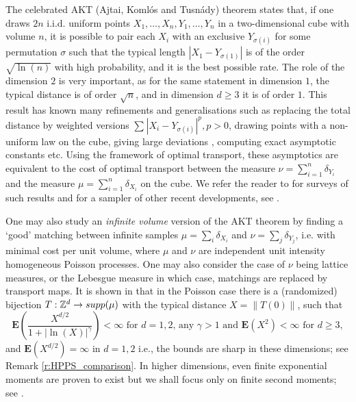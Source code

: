 \documentclass[12pt]{article}
\newcommand{\1}{\mathbf{1}}
\renewcommand{\footnote}[1]{}
\begin{document}
The celebrated AKT (Ajtai, Koml\'os and Tusn\'ady) theorem \cite{ajtai1984optimal} states that, if one draws $2n$ i.i.d.   uniform points $ X_{1},\dots ,X_{n},Y_{1},\dots ,Y_{n}$ in a two-dimensional cube with volume $n$, it is possible to pair each $ X_{i}$ with an exclusive $ Y_{\sigma (i)}$ for some permutation $ \sigma $  such that the typical length $|X_{1}-Y_{\sigma (1)}|$ is of the order $ \sqrt{\ln(n)}$ with high probability, and it is the best possible rate. The role of the dimension $ 2$ is very important, as for the same statement in dimension $ 1$, the typical distance is of order $ \sqrt{n}$, and in dimension $ d \geqslant 3$ it is of order $ 1.$ This result has known many refinements and generalisations such as replacing the total distance by weighted versions $ \sum_{} | X_{i}-Y_{\sigma (i)} | ^{p},p>0$,  drawing points with a non-uniform law on the cube, giving large deviations  \cite{fournier2015rate}, computing exact {asymptotic constants  \cite{ambrosio2019pde,huesmann2024asymptotics} etc}. Using the framework of optimal transport, these asymptotics are equivalent to the cost of optimal transport   {between} the measure {$\nu = \sum_{i=1}^n\delta_{Y_i}$ and the measure $\mu = \sum_{i=1}^n\delta_{X_i}$} on the cube. We refer the reader to \cite{shor1991minimax,talagrand2014upper,ledoux2022optimal} for surveys of such results and for a sampler of other recent developments, see \cite{barthe2013combinatorial,bobkov2021simple,goldman2023optimal}.

One may also study an {\it infinite volume} version of the AKT theorem by finding a {`good'} matching between infinite samples $ \mu  = \sum_{i}\delta _{X_{i}}$ and $ \nu  = \sum_{j}\delta _{Y_{j}}$,  {i.e. with minimal cost per unit volume,} where {$\mu$ and $\nu$ are independent unit intensity homogeneous Poisson processes. One may also consider the case of $\nu$ being lattice measures, or the Lebesgue measure in which case, matchings are replaced by transport maps.} It is shown in  \cite{holroyd2009poisson} that   {in the Poisson case} there is a {(randomized) bijection $T:\mathbb{Z} ^{d} \to  { \rm supp}  ( \mu)$ with the  typical distance $ X = \|T(0)\|$,  such that
%
\begin{equation}
\label{e:d2mom_Poisson}
\mathbf{E}\left(\frac{X^{d/2}}{1 + |\ln(X)|^{\gamma}}\right)<\infty \textrm{ for $d=1,2$, any $\gamma > 1$    and } \mathbf{E}(X^2) < \infty \textrm{ for $d \geqslant  3$},
\end{equation} %
%
and $\mathbf{E}(X^{d/2}) = \infty$ in $d = 1,2$ i.e., the bounds are sharp in these dimensions; see Remark \ref{r:HPPS_comparison}}. In higher dimensions, even finite exponential moments are proven {to exist} but we shall focus only on finite second moments; see \cite{hoffman2006stable,holroyd2009poisson,huesmann2013optimal,holroyd2022minimal}.
\end{document}
